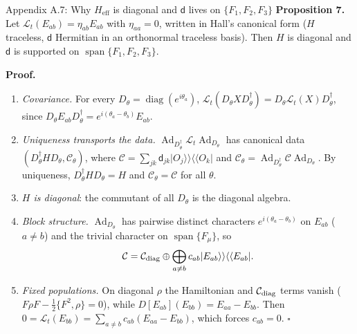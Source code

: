 \documentclass[aspectratio=169,11pt]{beamer}
\newcommand{\diag}{\operatorname{diag}}
\newcommand{\dmat}{\mathsf d}
\newcommand{\Heff}{H_{\mathrm{eff}}}
\begin{document}
\begin{frame}{Appendix A.7: Why $\Heff$ is diagonal and $\dmat$ lives on $\{F_1,F_2,F_3\}$}
\footnotesize
\textbf{Proposition 7.} Let $\mathcal L_t(E_{ab})=\eta_{ab}E_{ab}$ with $\eta_{aa}=0$, written in Hall's canonical form ($H$ traceless, $\dmat$ Hermitian in an orthonormal traceless basis). Then $H$ is diagonal and $\dmat$ is supported on $\operatorname{span}\{F_1,F_2,F_3\}$.
\medskip

\textbf{Proof.}
\begin{enumerate}\setlength\itemsep{3pt}
\item \emph{Covariance.} For every $D_\theta=\diag(e^{i\theta_a})$, $\mathcal L_t(D_\theta XD_\theta^\dagger)=D_\theta\mathcal L_t(X)D_\theta^\dagger$, since $D_\theta E_{ab}D_\theta^\dagger=e^{i(\theta_a-\theta_b)}E_{ab}$.
\item \emph{Uniqueness transports the data.} $\operatorname{Ad}_{D_\theta^\dagger}\mathcal L_t\operatorname{Ad}_{D_\theta}$ has canonical data $(D_\theta^\dagger HD_\theta,\mathcal C_\theta)$, where $\mathcal C=\sum_{jk}\dmat_{jk}\lvert O_j\rangle\rangle\langle\langle O_k\rvert$ and $\mathcal C_\theta=\operatorname{Ad}_{D_\theta^\dagger}\mathcal C\operatorname{Ad}_{D_\theta}$. By uniqueness, $D_\theta^\dagger HD_\theta=H$ and $\mathcal C_\theta=\mathcal C$ for all $\theta$.
\item \emph{$H$ is diagonal}: the commutant of all $D_\theta$ is the diagonal algebra.
\item \emph{Block structure.} $\operatorname{Ad}_{D_\theta}$ has pairwise distinct characters $e^{i(\theta_a-\theta_b)}$ on $E_{ab}$ ($a\neq b$) and the trivial character on $\operatorname{span}\{F_\mu\}$, so
\[
\mathcal C=\mathcal C_{\rm diag}\oplus\bigoplus_{a\neq b}c_{ab}\lvert E_{ab}\rangle\rangle\langle\langle E_{ab}\rvert .
\]
\item \emph{Fixed populations.} On diagonal $\rho$ the Hamiltonian and $\mathcal C_{\rm diag}$ terms vanish ($F\rho F-\frac12\{F^2,\rho\}=0$), while $D[E_{ab}](E_{bb})=E_{aa}-E_{bb}$. Then $0=\mathcal L_t(E_{bb})=\sum_{a\neq b}c_{ab}(E_{aa}-E_{bb})$, which forces $c_{ab}=0$. $\square$
\end{enumerate}
\end{frame}
\end{document}
